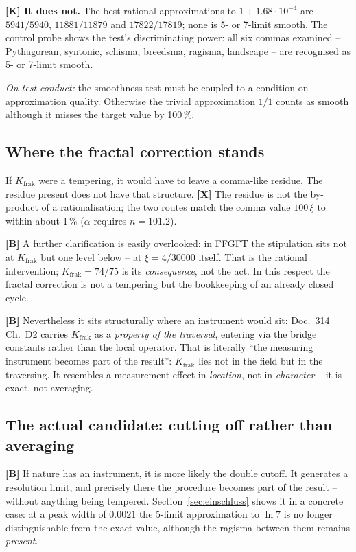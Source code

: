 \textbf{[K] It does not.} The best rational approximations to
$1 + 1.68\cdot10^{-4}$ are $5941/5940$, $11881/11879$ and
$17822/17819$; none is 5- or 7-limit smooth. The control probe shows the test's
discriminating power: all six commas examined -- Pythagorean, syntonic,
schisma, breedsma, ragisma, landscape -- are recognised as 5- or
7-limit smooth.

\emph{On test conduct:} the smoothness test must be coupled to a
condition on approximation quality. Otherwise the trivial
approximation $1/1$ counts as smooth although it misses the target
value by 100\,\%.

\subsection{Where the fractal correction stands}

\begin{keyresult}
If $K_\text{frak}$ were a tempering, it would have to leave a
comma-like residue. The residue present does not have that structure.
\textbf{[X]} The residue is not the by-product of a rationalisation; the
two routes match the comma value $100\,\xi$ to within about 1\,\% ($\alpha$ requires $n = 101.2$).
\end{keyresult}

\textbf{[B]} A further clarification is easily overlooked: in FFGFT the
stipulation sits not at $K_\text{frak}$ but one level below -- at
$\xi = 4/30000$ itself. That is the rational intervention;
$K_\text{frak} = 74/75$ is its \emph{consequence}, not the act. In this
respect the fractal correction is not a tempering but the bookkeeping
of an already closed cycle.

\textbf{[B]} Nevertheless it sits structurally where an instrument
would sit: Doc.~314 Ch.~D2 carries $K_\text{frak}$ as a \emph{property
of the traversal}, entering via the bridge constants rather than the
local operator. That is literally \enquote{the measuring instrument
becomes part of the result}: $K_\text{frak}$ lies not in the field but
in the traversing. It resembles a measurement effect in \emph{location},
not in \emph{character} -- it is exact, not averaging.

\subsection{The actual candidate: cutting off rather than averaging}

\textbf{[B]} If nature has an instrument, it is more likely the double
cutoff. It generates a resolution limit, and precisely there the
procedure becomes part of the result -- without anything being tempered.
Section~\ref{sec:einschluss} shows it in a concrete case: at a peak
width of $0.0021$ the 5-limit approximation to $\ln 7$ is no longer
distinguishable from the exact value, although the ragisma between them
remains \emph{present}.

